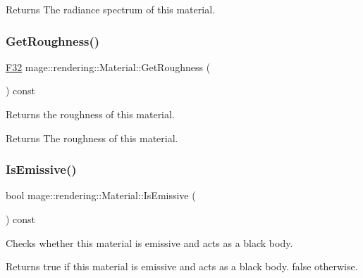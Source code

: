 \begin{DoxyReturn}{Returns}
The radiance spectrum of this material. 
\end{DoxyReturn}
\hypertarget{classmage_1_1rendering_1_1_material_a4c950a1b95e14246027de8ff0da4d55a}{}\label{classmage_1_1rendering_1_1_material_a4c950a1b95e14246027de8ff0da4d55a} 
\subsubsection{\texorpdfstring{Get\+Roughness()}{GetRoughness()}}
{\footnotesize\ttfamily \hyperlink{namespacemage_aa97e833b45f06d60a0a9c4fc22ae02c0}{F32} mage\+::rendering\+::\+Material\+::\+Get\+Roughness (\begin{DoxyParamCaption}{ }\end{DoxyParamCaption}) const\hspace{0.3cm}{\ttfamily [noexcept]}}

Returns the roughness of this material.

\begin{DoxyReturn}{Returns}
The roughness of this material. 
\end{DoxyReturn}
\hypertarget{classmage_1_1rendering_1_1_material_acf52f6bc5f849928751e10157bdb3c3c}{}\label{classmage_1_1rendering_1_1_material_acf52f6bc5f849928751e10157bdb3c3c} 
\subsubsection{\texorpdfstring{Is\+Emissive()}{IsEmissive()}}
{\footnotesize\ttfamily bool mage\+::rendering\+::\+Material\+::\+Is\+Emissive (\begin{DoxyParamCaption}{ }\end{DoxyParamCaption}) const\hspace{0.3cm}{\ttfamily [noexcept]}}

Checks whether this material is emissive and acts as a black body.

\begin{DoxyReturn}{Returns}
{\ttfamily true} if this material is emissive and acts as a black body. {\ttfamily false} otherwise. 
\end{DoxyReturn}
\hypertarget{classmage_1_1rendering_1_1_material_af750917e67bdaf7e47129617102887ab}{}\label{classmage_1_1rendering_1_1_material_af750917e67bdaf7e47129617102887ab} 
